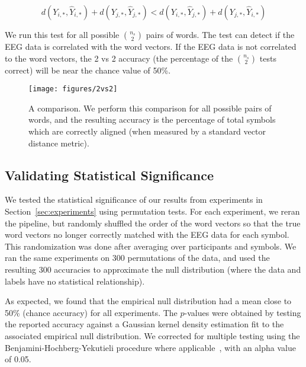 \begin{equation}
  d(Y_{i,*}, \hat{Y}_{i,*}) + d(Y_{j,*}, \hat{Y}_{j,*}) < d(Y_{i,*}, \hat{Y}_{j,*}) + d(Y_{j,*}, \hat{Y}_{i,*})
  \label{eq:2vs2}
\end{equation}
  
\noindent We run this test for all possible ${\binom{n_s}{2}}$ pairs of words. The \tvt test can detect if the EEG data is correlated with the word vectors. If the EEG data is not correlated to the word vectors, the 2 vs 2 accuracy (the percentage of the ${\binom{n_s}{2}}$ \tvt tests correct) will be  near the chance value of 50\%.

\begin{figure}[t]
  \centering
  \texttt{[image: figures/2vs2]}
  \caption{A \tvt comparison. We perform this comparison for all possible pairs of words, and the resulting \tvt accuracy is the percentage of total symbols which are correctly aligned (when measured by a standard vector distance metric).}
  \label{fig:2vs2}
\end{figure}

\subsection{Validating Statistical Significance}
We tested the statistical significance of our results from experiments in Section~\ref{sec:experiments} using permutation tests. For each experiment, we reran the pipeline, but randomly shuffled the order of the word vectors so that the true word vectors no longer correctly matched with the EEG data for each symbol. This randomization was done after averaging over participants and symbols. We ran the same experiments on 300 permutations of the data, and used the resulting 300 \tvt accuracies to approximate the null distribution (where the data and labels have no statistical relationship). 
  
As expected, we found that the empirical null distribution had a mean close to 50\% (chance accuracy) for all experiments. The $p$-values were obtained by testing the reported accuracy against a Gaussian kernel density estimation fit to the associated empirical null distribution. We corrected for multiple testing using the Benjamini-Hochberg-Yekutieli procedure where applicable~\cite{benjamini2001control}, with an alpha value of 0.05.
